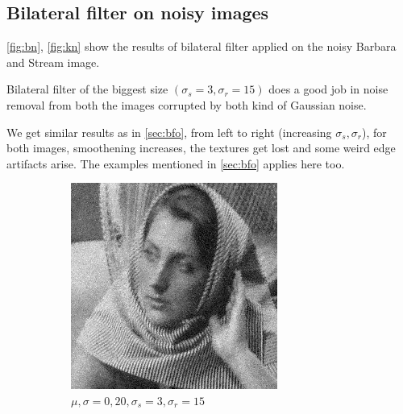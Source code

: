 \documentclass[a4paper, landscape]{article}
\begin{document}
\subsection{Bilateral filter on noisy images}
\ref{fig:bn}, \ref{fig:kn} show the results of bilateral filter applied on the noisy Barbara and Stream image.

Bilateral filter of the biggest size $(\sigma_s=3, \sigma_r=15)$ does a good job in noise removal from both the images corrupted by both kind of Gaussian noise. 

We get similar results as in \ref{sec:bfo}, from left to right (increasing $\sigma_s, \sigma_r$), for both images, smoothening increases, the textures get lost and some weird edge artifacts arise. The examples mentioned in \ref{sec:bfo} applies here too.
\begin{figure}
    \centering
    \begin{subfigure}{0.48\linewidth}
        \centering
        \includegraphics[width=\linewidth]{barbara256,σ_noise20,σ_spatial3,σ_range15.png}
        \caption{$\mu, \sigma = 0, 20, \sigma_s=3, \sigma_r=15$}
    \end{subfigure}
    \begin{subfigure}{0.48\linewidth}
        \centering

\end{subfigure}
\end{figure}
\end{document}
